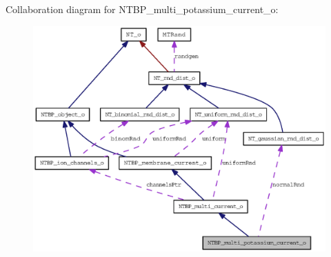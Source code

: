 Collaboration diagram for NTBP\_\-multi\_\-potassium\_\-current\_\-o:
\nopagebreak
\begin{figure}[H]
\begin{center}
\leavevmode
\includegraphics[width=400pt]{class_n_t_b_p__multi__potassium__current__o__coll__graph}
\end{center}
\end{figure}
